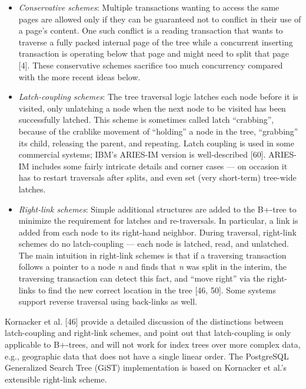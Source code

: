 \documentclass[a4paper,11pt,twoside,openright]{book}
\begin{document}
\begin{itemize}
\item
  \emph{Conservative schemes}: Multiple transactions wanting to access
  the same pages are allowed only if they can be guaranteed not to
  conflict in their use of a page's content. One such conflict is a
  reading transaction that wants to traverse a fully packed internal
  page of the tree while a concurrent inserting transaction is operating
  below that page and might need to split that page {[}4{]}. These
  conservative schemes sacrifice too much concurrency compared with the
  more recent ideas below.
\item
  \emph{Latch-coupling schemes}: The tree traversal logic latches each
  node before it is visited, only unlatching a node when the next node
  to be visited has been successfully latched. This scheme is sometimes
  called latch ``crabbing'', because of the crablike movement of
  ``holding'' a node in the tree, ``grabbing'' its child, releasing the
  parent, and repeating. Latch coupling is used in some commercial
  systems; IBM's ARIES-IM version is well-described {[}60{]}. ARIES-IM
  includes some fairly intricate details and corner cases --- on
  occasion it has to restart traversals after splits, and even set (very
  short-term) tree-wide latches.
\end{itemize}

\begin{itemize}

\item
  \emph{Right-link schemes}: Simple additional structures are added to
  the B+-tree to minimize the requirement for latches and re-traversals.
  In particular, a link is added from each node to its right-hand
  neighbor. During traversal, right-link schemes do no latch-coupling
  --- each node is latched, read, and unlatched. The main intuition in
  right-link schemes is that if a traversing transaction follows a
  pointer to a node \emph{n} and finds that \emph{n} was split in the
  interim, the traversing transaction can detect this fact, and ``move
  right'' via the right-links to find the new correct location in the
  tree {[}46, 50{]}. Some systems support reverse traversal using
  back-links as well.
\end{itemize}

Kornacker et al. {[}46{]} provide a detailed discussion of the
distinctions between latch-coupling and right-link schemes, and point
out that latch-coupling is only applicable to B+-trees, and will not
work for index trees over more complex data, e.g., geographic data that
does not have a single linear order. The PostgreSQL Generalized Search
Tree (GiST) implementation is based on Kornacker et al.'s extensible
right-link scheme.
\end{document}
